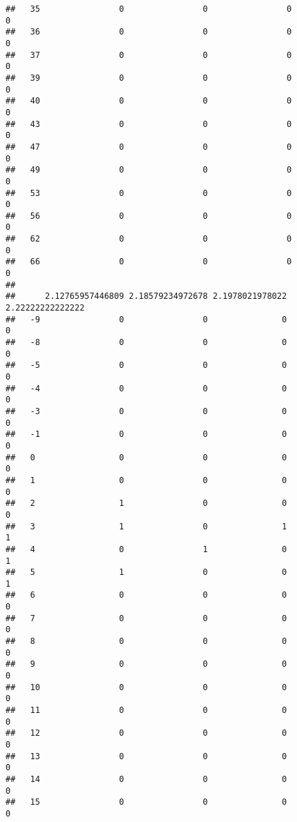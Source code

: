 \documentclass[]{article}
\begin{document}
\begin{verbatim}
##   35                0                0                0                0
##   36                0                0                0                0
##   37                0                0                0                0
##   39                0                0                0                0
##   40                0                0                0                0
##   43                0                0                0                0
##   47                0                0                0                0
##   49                0                0                0                0
##   53                0                0                0                0
##   56                0                0                0                0
##   62                0                0                0                0
##   66                0                0                0                0
##     
##      2.12765957446809 2.18579234972678 2.1978021978022 2.22222222222222
##   -9                0                0               0                0
##   -8                0                0               0                0
##   -5                0                0               0                0
##   -4                0                0               0                0
##   -3                0                0               0                0
##   -1                0                0               0                0
##   0                 0                0               0                0
##   1                 0                0               0                0
##   2                 1                0               0                0
##   3                 1                0               1                1
##   4                 0                1               0                1
##   5                 1                0               0                1
##   6                 0                0               0                0
##   7                 0                0               0                0
##   8                 0                0               0                0
##   9                 0                0               0                0
##   10                0                0               0                0
##   11                0                0               0                0
##   12                0                0               0                0
##   13                0                0               0                0
##   14                0                0               0                0
##   15                0                0               0                0

\end{verbatim}
\end{document}
